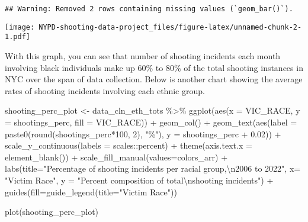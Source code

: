 \documentclass[
]{article}
\newenvironment{Shaded}{\begin{snugshade}}{\end{snugshade}}
\newcommand{\AttributeTok}[1]{\textcolor[rgb]{0.77,0.63,0.00}{#1}}
\newcommand{\DecValTok}[1]{\textcolor[rgb]{0.00,0.00,0.81}{#1}}
\newcommand{\FloatTok}[1]{\textcolor[rgb]{0.00,0.00,0.81}{#1}}
\newcommand{\FunctionTok}[1]{\textcolor[rgb]{0.00,0.00,0.00}{#1}}
\newcommand{\NormalTok}[1]{#1}
\newcommand{\OtherTok}[1]{\textcolor[rgb]{0.56,0.35,0.01}{#1}}
\newcommand{\SpecialCharTok}[1]{\textcolor[rgb]{0.00,0.00,0.00}{#1}}
\newcommand{\StringTok}[1]{\textcolor[rgb]{0.31,0.60,0.02}{#1}}
\begin{document}
\begin{verbatim}
## Warning: Removed 2 rows containing missing values (`geom_bar()`).
\end{verbatim}

\texttt{[image: NYPD-shooting-data-project\_files/figure-latex/unnamed-chunk-2-1.pdf]}

With this graph, you can see that number of shooting incidents each
month involving black individuals make up 60\% to 80\% of the total
shooting instances in NYC over the span of data collection. Below is
another chart showing the average rates of shooting incidents involving
each ethnic group.

\begin{Shaded}
\begin{Highlighting}[]
\NormalTok{shooting\_perc\_plot }\OtherTok{\textless{}{-}}\NormalTok{ data\_cln\_eth\_tots }\SpecialCharTok{\%\textgreater{}\%} \FunctionTok{ggplot}\NormalTok{(}\FunctionTok{aes}\NormalTok{(}\AttributeTok{x =}\NormalTok{ VIC\_RACE, }\AttributeTok{y =}\NormalTok{ shootings\_perc, }\AttributeTok{fill =}\NormalTok{ VIC\_RACE)) }\SpecialCharTok{+} \FunctionTok{geom\_col}\NormalTok{() }\SpecialCharTok{+} \FunctionTok{geom\_text}\NormalTok{(}\FunctionTok{aes}\NormalTok{(}\AttributeTok{label =} \FunctionTok{paste0}\NormalTok{(}\FunctionTok{round}\NormalTok{(shootings\_perc}\SpecialCharTok{*}\DecValTok{100}\NormalTok{, }\DecValTok{2}\NormalTok{), }\StringTok{"\%"}\NormalTok{), }\AttributeTok{y =}\NormalTok{ shootings\_perc }\SpecialCharTok{+} \FloatTok{0.02}\NormalTok{)) }\SpecialCharTok{+} \FunctionTok{scale\_y\_continuous}\NormalTok{(}\AttributeTok{labels =}\NormalTok{ scales}\SpecialCharTok{::}\NormalTok{percent) }\SpecialCharTok{+}  \FunctionTok{theme}\NormalTok{(}\AttributeTok{axis.text.x =} \FunctionTok{element\_blank}\NormalTok{()) }\SpecialCharTok{+} \FunctionTok{scale\_fill\_manual}\NormalTok{(}\AttributeTok{values=}\NormalTok{colors\_arr)  }\SpecialCharTok{+} \FunctionTok{labs}\NormalTok{(}\AttributeTok{title=}\StringTok{"Percentage of shooting incidents per racial group,}\SpecialCharTok{\textbackslash{}n}\StringTok{2006 to 2022"}\NormalTok{, }\AttributeTok{x=} \StringTok{"Victim Race"}\NormalTok{, }\AttributeTok{y =} \StringTok{"Percent composition of total}\SpecialCharTok{\textbackslash{}n}\StringTok{shooting incidents"}\NormalTok{) }\SpecialCharTok{+} \FunctionTok{guides}\NormalTok{(}\AttributeTok{fill=}\FunctionTok{guide\_legend}\NormalTok{(}\AttributeTok{title=}\StringTok{"Victim Race"}\NormalTok{))}

\FunctionTok{plot}\NormalTok{(shooting\_perc\_plot)}
\end{Highlighting}
\end{Shaded}
\end{document}
